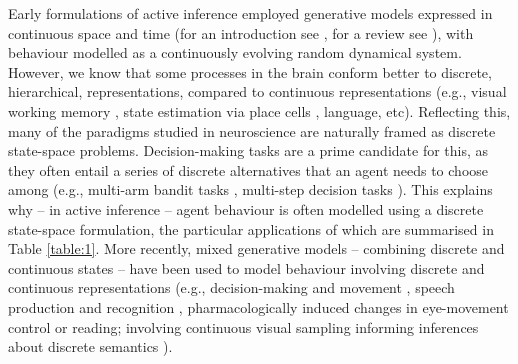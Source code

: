 \documentclass[review,12pt,authoryear]{elsarticle}
\begin{document}
Early formulations of active inference employed generative models expressed in continuous space and time (for an introduction see \citep{bogaczTutorialFreeenergyFramework2017}, for a review see \citep{buckleyFreeEnergyPrinciple2017}), with behaviour modelled as a continuously evolving random dynamical system. However, we know that some processes in the brain conform better to discrete, hierarchical, representations, compared to continuous representations (e.g., visual working memory \citep{luckCapacityVisualWorking1997, zhangDiscreteFixedResolutionRepresentations2008}, state estimation via place cells \citep{eichenbaumHippocampusMemoryPlace1999, okeefeHippocampusSpatialMap1971}, language, etc). Reflecting this, many of the paradigms studied in neuroscience are naturally framed as discrete state-space problems. Decision-making tasks are a prime candidate for this, as they often entail a series of discrete alternatives that an agent needs to choose among (e.g., multi-arm bandit tasks \citep{dawCorticalSubstratesExploratory2006, reverdyModelingHumanDecisionmaking2013, wuGeneralizationGuideshuman2018}, multi-step decision tasks \citep{dawModelBasedInfluencesHumans2011}). This explains why – in active inference – agent behaviour is often modelled using a discrete state-space formulation, the particular applications of which are summarised in Table \ref{table:1}. More recently, mixed generative models \citep{fristonGraphicalBrainBelief2017} – combining discrete and continuous states – have been used to model behaviour involving discrete and continuous representations (e.g., decision-making and movement \citep{parrDiscreteContinuousBrain2018}, speech production and recognition \citep{fristonActiveListening2020}, pharmacologically induced changes in eye-movement control \citep{parrComputationalPharmacologyOculomotion2019} or reading; involving continuous visual sampling informing inferences about discrete semantics \citep{fristonGraphicalBrainBelief2017}).
\end{document}

